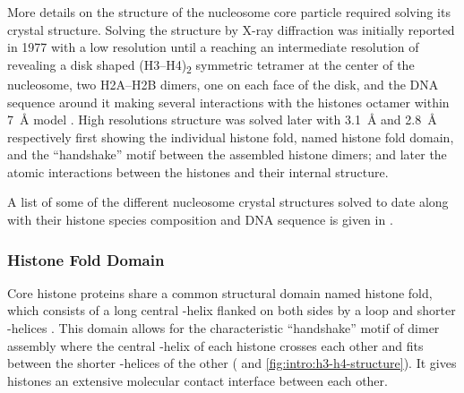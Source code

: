     More details on the structure of the nucleosome core particle required
    solving its crystal structure.  Solving the structure by X-ray
    diffraction was initially reported in 1977
    \citep{finch1977-first-structure}
    with a low resolution until a reaching an
    intermediate resolution of
    revealing a disk shaped (H3--H4)\textsubscript{2} symmetric tetramer
    at the center of the nucleosome, two H2A--H2B dimers,
    one on each face of the disk, and the DNA sequence around it
    making several interactions with the histones octamer within
    \SI{7}{\angstrom} model \citep{richmond1984-7angstrom}.
    High resolutions structure was solved later
    \citep{arents1991-31angstrom,luger1997-28angstrom}
    with \SI{3.1}{\angstrom} and \SI{2.8}{\angstrom}
    respectively
    first showing the individual histone fold, named histone fold domain,
    and the ``handshake'' motif between the assembled histone dimers;
    and later the atomic interactions between the histones and their
    internal structure.

    A list of some of the
    different nucleosome crystal structures solved to date along with their histone species
    composition and DNA sequence is given in .


    \subsubsection{Histone Fold Domain}

      Core histone proteins share a common structural domain named
      histone fold, which consists of a long central
      \textalpha-helix flanked on both sides by a loop
      and shorter \textalpha-helices \citep{arents1991-31angstrom, arents1995histone-fold}.
      This domain allows for the characteristic ``handshake'' motif
      of dimer assembly where the central \textalpha-helix of each
      histone crosses each other and fits between the shorter
      \textalpha-helices of the other (
      and \ref{fig:intro:h3-h4-structure}).
      It gives histones an extensive molecular contact interface
      between each other.

